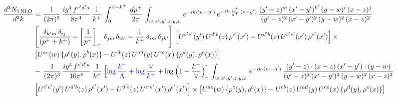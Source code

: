 \documentclass[9pt]{article}
\numberwithin{equation}{section}
\begin{document}
\begin{align}
     \frac{d^{3}N_{1\,\rm NLO}}{d^{3}k} & = \frac{1}{(2\pi)^{3}}\, \frac{ig^{4}\,f^{c'd'a}}{8\pi^{4}}\, \frac{1}{k^{+}}\,\int_{0}^{\vee-k^{+}}\,  \frac{dp^{+}}{2\pi}\, \int_{w,x',y',z,y,x}\, e^{-ik\cdot (w-y')}\, e^{-ik\cdot \frac{p^{+}}{k^{+}}\,(z-y')}\,\frac{(y'-z)^{m}\,(x'-y')^{k'}\,(y-w)^{i}\,(x-z)^{j}}{(y'-z)^{2}\,(x'-y')^{2}\,(y-w)^{2}\,(x-z)^{2}}\notag \\ & \left[\frac{\delta_{k'm}\,\delta_{ij}}{(p^{+}+k^{+})}-\left[\frac{1}{p^{+}}\right]_{+}\,\delta_{jm}\,\delta_{ik'}-\frac{1}{k^{+}}\, \delta_{im}\, \delta_{jk'}\right]\, \left[U^{c'e'}(y')\,U^{d'b}(z)\,\rho^{e'}(x')-U^{d'b}(z)\,U^{c'e'}(x')\,\rho^{e'}(x')\right]\times\notag \\ &  \left[U^{ac}(w)\, \{\rho^{c}(y),\rho^{b}(x)\}-U^{cb}(z)\,U^{ad}(y)\,U^{ce}(x)\,\{\rho^{d}(y),\rho^{e}(x)\}\right]\notag \\ & -\,\frac{1}{(2\pi)^{3}}\, \frac{ig^{4}\,f^{c'd'a}}{16\pi^{5}}\, \frac{1}{k^{+}}\,\Big[{\color{blue}\log\frac{k^{+}}{\Lambda}+\log\frac{\vee}{k^{+}}}+\log\Big(1-\frac{k^{+}}{\vee}\Big)\Big]\, \int_{w,x',y',z,y,x}\, e^{-ik\cdot (w-y')}\,\frac{(y'-z)\cdot (x-z)\,(x'-y')\cdot (y-w)}{(y'-z)^{2}\,(x'-y')^{2}\,(y-w)^{2}\,(x-z)^{2}}\notag \\ &  \left[U^{c'e'}(y')\,U^{d'b}(z)\,\rho^{e'}(x')-U^{d'b}(z)\,U^{c'e'}(x')\,\rho^{e'}(x')\right]\times  \left[U^{ac}(w)\, \{\rho^{c}(y),\rho^{b}(x)\}-U^{cb}(z)\,U^{ad}(y)\,U^{ce}(x)\,\{\rho^{d}(y),\rho^{e}(x)\}\right]
\end{align}
\end{document}
